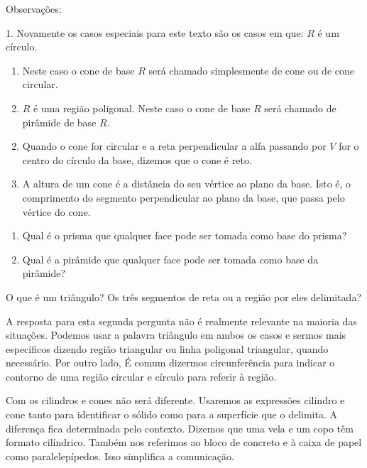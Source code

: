 Observações:

1. Novamente os casos especiais para este texto são os casos em que:
\(R\) é um círculo.
\begin{enumerate}
\item {} 
Neste caso o cone de base \(R\) será chamado simplesmente de cone ou de cone circular.

\item {} 
\(R\) é uma região poligonal. Neste caso o cone de base \(R\) será chamado de pirâmide de base \(R\).

\end{enumerate}
\begin{enumerate}
\setcounter{enumi}{1}
\item {} 
Quando o cone for circular e a reta perpendicular a alfa passando por \(V\) for o centro do círculo da base, dizemos que o cone é reto.

\item {} 
A altura de um cone é a distância do seu vértice ao plano da base. Isto é, o comprimento do segmento perpendicular ao plano da base, que passa pelo vértice do cone.

\end{enumerate}

\begin{reflection}{}
\begin{enumerate}
\item {} 
Qual é o prisma que qualquer face pode ser tomada como base do prisma?

\item {} 
Qual é a pirâmide que qualquer face pode ser tomada como base da pirâmide?

\end{enumerate}
\end{reflection}

\begin{observation}{}

O que é um triângulo? Os três segmentos de  reta ou a região por eles delimitada?

A resposta para esta segunda pergunta não é realmente relevante na maioria das situações. Podemos usar a palavra triângulo em ambos os casos e sermos mais específicos dizendo região triangular ou linha poligonal triangular, quando necessário. Por outro lado, É comum dizermos circunferência para indicar o contorno de uma região circular e círculo para referir  à região.

Com os cilindros e cones não será diferente. Usaremos as expressões cilindro e cone tanto para identificar o sólido como para a superfície que o delimita. A diferença fica determinada pelo contexto. Dizemos que uma vela e um copo têm formato cilíndrico. Também nos referimos ao bloco de concreto e à caixa de papel como paralelepípedos. Isso simplifica a comunicação.
\end{observation}


